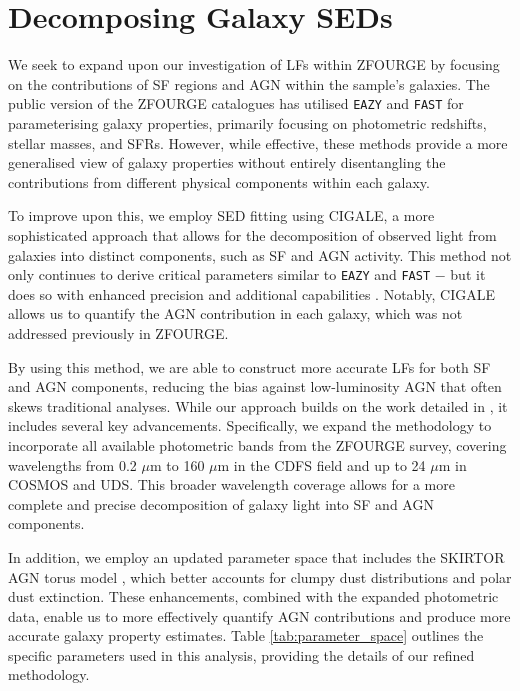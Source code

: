 \section{Decomposing Galaxy SEDs} \label{Sec: CIGALE}

We seek to expand upon our investigation of LFs within ZFOURGE by focusing on the contributions of SF regions and AGN within the sample's galaxies. The public version of the ZFOURGE catalogues has utilised \texttt{EAZY} \citep{brammer_eazy_2008} and \texttt{FAST} \citep{kriek_ultra-deep_2009} for parameterising galaxy properties, primarily focusing on photometric redshifts, stellar masses, and SFRs. However, while effective, these methods provide a more generalised view of galaxy properties without entirely disentangling the contributions from different physical components within each galaxy.

To improve upon this, we employ SED fitting using CIGALE, \citep{boquien_cigale_2019} a more sophisticated approach that allows for the decomposition of observed light from galaxies into distinct components, such as SF and AGN activity. This method not only continues to derive critical parameters similar to \texttt{EAZY} and \texttt{FAST} $-$ but it does so with enhanced precision and additional capabilities \citep{boquien_cigale_2019}. Notably, CIGALE allows us to quantify the AGN contribution in each galaxy, which was not addressed previously in ZFOURGE. 

By using this method, we are able to construct more accurate LFs for both SF and AGN components, reducing the bias against low-luminosity AGN that often skews traditional analyses. While our approach builds on the work detailed in \cite{cowley_decoupled_2018}, it includes several key advancements. Specifically, we expand the methodology to incorporate all available photometric bands from the ZFOURGE survey, covering wavelengths from 0.2 $\mu$m to 160 $\mu$m in the CDFS field and up to 24 $\mu$m in COSMOS and UDS. This broader wavelength coverage allows for a more complete and precise decomposition of galaxy light into SF and AGN components.

In addition, we employ an updated parameter space that includes the SKIRTOR AGN torus model \citep{stalevski_dust_2016}, which better accounts for clumpy dust distributions and polar dust extinction. These enhancements, combined with the expanded photometric data, enable us to more effectively quantify AGN contributions and produce more accurate galaxy property estimates. Table \ref{tab:parameter_space} outlines the specific parameters used in this analysis, providing the details of our refined methodology.

